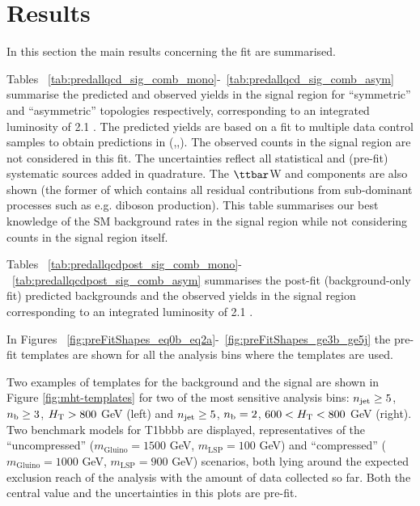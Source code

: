 \section{Results}
\label{sec:results}

In this section the main results concerning the fit are summarised. 

Tables ~\ref{tab:predallqcd_sig_comb_mono}-~\ref{tab:predallqcd_sig_comb_asym} summarise the predicted and observed yields in the signal region for ``symmetric'' and ``asymmetric'' topologies respectively, 
corresponding to an integrated luminosity of 2.1 \ifb.
The predicted yields are based on a fit to multiple data control samples to obtain predictions in (\nj,\nb,\scalht). 
The observed counts in the signal region are not considered in this fit. 
The uncertainties reflect all statistical and (pre-fit) systematic sources added in quadrature. 
The $\ttbar$W and \znunu components are also shown (the former of which contains all residual contributions from sub-dominant processes such as e.g. diboson production). 
This table summarises our best knowledge of the SM background rates in the signal region while not considering counts in the signal region itself. 

Tables ~\ref{tab:predallqcdpost_sig_comb_mono}-~\ref{tab:predallqcdpost_sig_comb_asym} summarises the post-fit (background-only fit) predicted backgrounds and the 
observed yields in the signal region corresponding to an integrated luminosity of 2.1 \ifb. 

In Figures ~\ref{fig:preFitShapes_eq0b_eq2a}-~\ref{fig:preFitShapes_ge3b_ge5j} the pre-fit \MHT templates are shown for all the analysis bins where the \MHT templates are used.

Two examples of \mht templates for the background and the signal are shown in Figure \ref{fig:mht-templates} for two of the most sensitive analysis bins: 
$\njet\geq5$, $\nb\geq3$, $\scalht>800$ GeV (left) and $\njet\geq5$, $\nb=2$, $600<\scalht<800$ GeV (right).
Two benchmark models for T1bbbb are displayed, representatives of the ``uncompressed'' ($m_{\mathrm{Gluino}}=1500$ GeV, $m_{\mathrm{LSP}}=100$ GeV) 
and ``compressed'' ($m_{\mathrm{Gluino}}=1000$ GeV, $m_{\mathrm{LSP}}=900$ GeV) scenarios, 
both lying around the expected exclusion reach of the analysis with the amount of data collected so far. 
Both the central value and the uncertainties in this plots are pre-fit.

